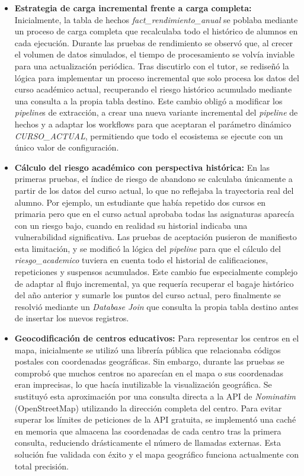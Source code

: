 \begin{itemize}

\item \textbf{Estrategia de carga incremental frente a carga completa:} Inicialmente, la tabla de hechos \emph{fact\_rendimiento\_anual} se poblaba mediante un proceso de carga completa que recalculaba todo el histórico de alumnos en cada ejecución. Durante las pruebas de rendimiento se observó que, al crecer el volumen de datos simulados, el tiempo de procesamiento se volvía inviable para una actualización periódica. Tras discutirlo con el tutor, se rediseñó la lógica para implementar un proceso incremental que solo procesa los datos del curso académico actual, recuperando el riesgo histórico acumulado mediante una consulta a la propia tabla destino. Este cambio obligó a modificar los \textit{pipeline}s de extracción, a crear una nueva variante incremental del \textit{pipeline} de hechos y a adaptar los workflows para que aceptaran el parámetro dinámico \emph{CURSO\_ACTUAL}, permitiendo que todo el ecosistema se ejecute con un único valor de configuración.

\item \textbf{Cálculo del riesgo académico con perspectiva histórica:} En las primeras pruebas, el índice de riesgo de abandono se calculaba únicamente a partir de los datos del curso actual, lo que no reflejaba la trayectoria real del alumno. Por ejemplo, un estudiante que había repetido dos cursos en primaria pero que en el curso actual aprobaba todas las asignaturas aparecía con un riesgo bajo, cuando en realidad su historial indicaba una vulnerabilidad significativa. Las pruebas de aceptación pusieron de manifiesto esta limitación, y se modificó la lógica del \textit{pipeline} para que el cálculo del \emph{riesgo\_academico} tuviera en cuenta todo el historial de calificaciones, repeticiones y suspensos acumulados. Este cambio fue especialmente complejo de adaptar al flujo incremental, ya que requería recuperar el bagaje histórico del año anterior y sumarle los puntos del curso actual, pero finalmente se resolvió mediante un \emph{Database Join} que consulta la propia tabla destino antes de insertar los nuevos registros.

\item \textbf{Geocodificación de centros educativos:} Para representar los centros en el mapa, inicialmente se utilizó una librería pública que relacionaba códigos postales con coordenadas geográficas. Sin embargo, durante las pruebas se comprobó que muchos centros no aparecían en el mapa o sus coordenadas eran imprecisas, lo que hacía inutilizable la visualización geográfica. Se sustituyó esta aproximación por una consulta directa a la API de \emph{Nominatim} (OpenStreetMap) utilizando la dirección completa del centro. Para evitar superar los límites de peticiones de la API gratuita, se implementó una caché en memoria que almacena las coordenadas de cada centro tras la primera consulta, reduciendo drásticamente el número de llamadas externas. Esta solución fue validada con éxito y el mapa geográfico funciona actualmente con total precisión.


\end{itemize}
